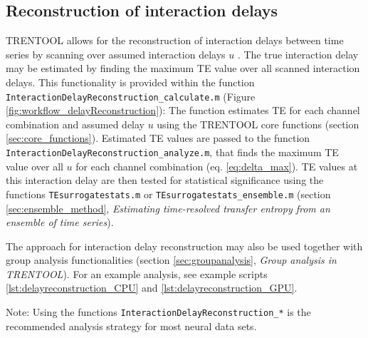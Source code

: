 \documentclass[a4paper,10pt]{article}
\begin{document}
\subsection{Reconstruction of interaction delays} \label{sec:interaction_delays}

TRENTOOL allows for the reconstruction of interaction delays between time series by scanning over assumed interaction delays $u$ \cite{wibral2013}. The true interaction delay may be estimated by finding the maximum TE value over all scanned interaction delays. This functionality is provided within the function \verb&InteractionDelayReconstruction_calculate.m& (Figure \ref{fig:workflow_delayReconstruction}): The function estimates TE for each channel combination and assumed delay $u$ using the TRENTOOL core functions (section \ref{sec:core_functions}). Estimated TE values are passed to the function \verb&InteractionDelayReconstruction_analyze.m&, that finds the maximum TE value over all $u$ for each channel combination (eq. \ref{eq:delta_max}). TE values at this interaction delay are then tested for statistical significance using the functions \verb&TEsurrogatestats.m& or \verb&TEsurrogatestats_ensemble.m& (section \ref{sec:ensemble_method}, \textit{Estimating time-resolved transfer entropy from an ensemble of time series}). 

The approach for interaction delay reconstruction may also be used together with group analysis functionalities (section \ref{sec:groupanalysis}, \textit{Group analysis in TRENTOOL}). For an example analysis, see example scripts \ref{lst:delayreconstruction_CPU} and \ref{lst:delayreconstruction_GPU}. 

Note: Using the functions \verb&InteractionDelayReconstruction_*& is the recommended analysis strategy for most neural data sets.
\end{document}
